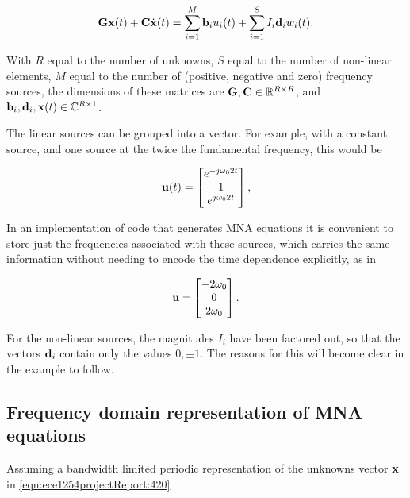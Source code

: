 \begin{equation}\label{eqn:ece1254projectReport:420}
\BG \Bx(t) + \BC \dot{\Bx}(t) = \sum_{i = 1}^M \Bb_i u_i(t) + \sum_{i = 1}^S I_i \Bd_i w_i(t).
\end{equation}

With \( R \) equal to the number of unknowns, \( S \) equal to the number of non-linear elements, \( M \) equal to the number of (positive, negative and zero) frequency sources, the dimensions of these matrices are \( \mathbf{G}, \mathbf{C} \in \text{$\mathbb{R}^{R \times R}$} \), and \( \mathbf{b}_i, \mathbf{d}_i, \mathbf{x}(t) \in \text{$\mathbb{C}^{R \times 1}$} \).

The linear sources can be grouped into a vector.
For example, with a constant source, and one source at the twice the fundamental frequency, this would be

\begin{equation}\label{eqn:ece1254projectReport:440}
\Bu(t) =
\begin{bmatrix}
e^{ -j \omega_0 2 t } \\
1 \\
e^{ j \omega_0 2 t }
\end{bmatrix},
\end{equation}

In an implementation of code that generates MNA equations it is convenient to store just the frequencies associated with these sources, which carries the same information without needing to encode the time dependence explicitly, as in

\begin{equation}\label{eqn:ece1254projectReport:460}
\Bu =
\begin{bmatrix}
- 2 \omega_0 \\
0 \\
2 \omega_0
\end{bmatrix}.
\end{equation}

For the non-linear sources, the magnitudes \( I_i \) have been factored out, so that the vectors \( \mathbf{d}_i \) contain only the values \( 0, \pm 1 \).
The reasons for this will become clear in the example to follow.

\subsection{Frequency domain representation of MNA equations}

Assuming a bandwidth limited periodic representation of the unknowns vector \( \mathbf{x} \) in \cref{eqn:ece1254projectReport:420}

